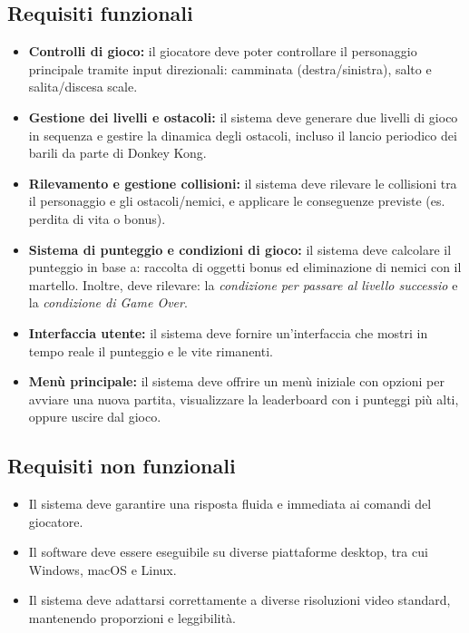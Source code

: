 \documentclass[a4paper,12pt]{report}
\begin{document}
\subsection*{Requisiti funzionali}
\begin{itemize}
	\item \textbf{Controlli di gioco:}
	      il giocatore deve poter controllare il personaggio principale tramite input direzionali: camminata (destra/sinistra), salto e salita/discesa scale.
	\item \textbf{Gestione dei livelli e ostacoli:}
	      il sistema deve generare due livelli di gioco in sequenza e gestire la dinamica degli ostacoli, incluso il lancio periodico dei barili da parte di Donkey Kong.
	\item \textbf{Rilevamento e gestione collisioni:}
	      il sistema deve rilevare le collisioni tra il personaggio e gli ostacoli/nemici, e applicare le conseguenze previste (es. perdita di vita o bonus).
	\item  \textbf{Sistema di punteggio e condizioni di gioco:}
	      il sistema deve calcolare il punteggio in base a: raccolta di oggetti bonus ed eliminazione di nemici con il martello.
	      Inoltre, deve rilevare: la \textit{condizione per passare al livello successio} e la \textit{condizione di Game Over}.
	\item \textbf{Interfaccia utente:}
	      il sistema deve fornire un'interfaccia che mostri in tempo reale il punteggio e  le vite rimanenti.
	\item \textbf{Menù principale:}
	      il sistema deve offrire un menù iniziale con opzioni per avviare una nuova partita, visualizzare la leaderboard con i punteggi più alti, oppure uscire dal gioco.
\end{itemize}

\subsection*{Requisiti non funzionali}
\begin{itemize}
	\item Il sistema deve garantire una risposta fluida e immediata ai comandi del giocatore.
	\item Il software deve essere eseguibile su diverse piattaforme desktop, tra cui Windows, macOS e Linux.
	\item Il sistema deve adattarsi correttamente a diverse risoluzioni video standard, mantenendo proporzioni e leggibilità.
\end{itemize}
\end{document}
